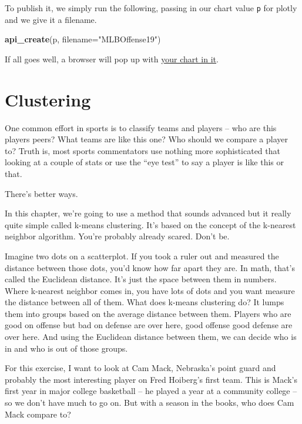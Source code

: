 \documentclass[]{book}
\newenvironment{Shaded}{\begin{snugshade}}{\end{snugshade}}
\newcommand{\DataTypeTok}[1]{\textcolor[rgb]{0.13,0.29,0.53}{#1}}
\newcommand{\KeywordTok}[1]{\textcolor[rgb]{0.13,0.29,0.53}{\textbf{#1}}}
\newcommand{\NormalTok}[1]{#1}
\newcommand{\StringTok}[1]{\textcolor[rgb]{0.31,0.60,0.02}{#1}}
\begin{document}
To publish it, we simply run the following, passing in our chart value \texttt{p} for plotly and we give it a filename.

\begin{Shaded}
\begin{Highlighting}[]
\KeywordTok{api_create}\NormalTok{(p, }\DataTypeTok{filename=}\StringTok{"MLBOffense19"}\NormalTok{)}
\end{Highlighting}
\end{Shaded}

If all goes well, a browser will pop up with \href{https://plot.ly/~mattwaite/1/\#/}{your chart in it}.

\hypertarget{clustering}{%
\chapter{Clustering}\label{clustering}}

One common effort in sports is to classify teams and players -- who are this players peers? What teams are like this one? Who should we compare a player to? Truth is, most sports commentators use nothing more sophisticated that looking at a couple of stats or use the ``eye test'' to say a player is like this or that.

There's better ways.

In this chapter, we're going to use a method that sounds advanced but it really quite simple called k-means clustering. It's based on the concept of the k-nearest neighbor algorithm. You're probably already scared. Don't be.

Imagine two dots on a scatterplot. If you took a ruler out and measured the distance between those dots, you'd know how far apart they are. In math, that's called the Euclidean distance. It's just the space between them in numbers. Where k-nearest neighbor comes in, you have lots of dots and you want measure the distance between all of them. What does k-means clustering do? It lumps them into groups based on the average distance between them. Players who are good on offense but bad on defense are over here, good offense good defense are over here. And using the Euclidean distance between them, we can decide who is in and who is out of those groups.

For this exercise, I want to look at Cam Mack, Nebraska's point guard and probably the most interesting player on Fred Hoiberg's first team. This is Mack's first year in major college basketball -- he played a year at a community college -- so we don't have much to go on. But with a season in the books, who does Cam Mack compare to?
\end{document}
